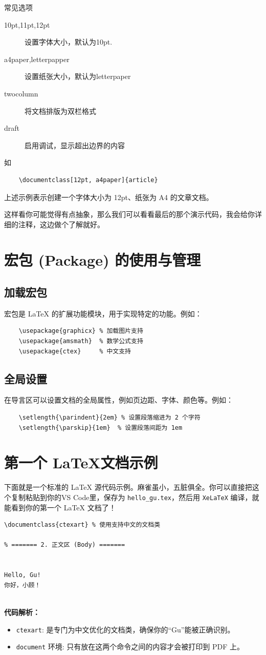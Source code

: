 \begin{mybox}{常见选项}
	\begin{description}
		\item[10pt,11pt,12pt]设置字体大小，默认为10pt.
		\item[a4paper,letterpapper]设置纸张大小，默认为letterpaper
		\item[twocolumn]将文档排版为双栏格式
		\item[draft]启用调试，显示超出边界的内容  
	\end{description}
\end{mybox}
如
\begin{lstlisting}
	\documentclass[12pt, a4paper]{article}
\end{lstlisting}
上述示例表示创建一个字体大小为 12pt、纸张为 A4 的文章文档。

这样看你可能觉得有点抽象，那么我们可以看看最后的那个演示代码，我会给你详细的注释，这边做个了解就好。


\section{宏包 (Package) 的使用与管理}
\subsection{加载宏包}
宏包是 LaTeX 的扩展功能模块，用于实现特定的功能。例如：
\begin{lstlisting}
	\usepackage{graphicx} % 加载图片支持
	\usepackage{amsmath}  % 数学公式支持
	\usepackage{ctex}     % 中文支持
\end{lstlisting}

\subsection{全局设置}
在导言区可以设置文档的全局属性，例如页边距、字体、颜色等。例如：
\begin{lstlisting}
	\setlength{\parindent}{2em} % 设置段落缩进为 2 个字符
	\setlength{\parskip}{1em}  % 设置段落间距为 1em
\end{lstlisting}

\newpage
\section{第一个 \LaTeX 文档示例}

下面就是一个标准的 \LaTeX{} 源代码示例。麻雀虽小，五脏俱全。你可以直接把这个复制粘贴到你的VS Code里，保存为 \texttt{hello\_gu.tex}，然后用 \texttt{XeLaTeX} 编译，就能看到你的第一个 \LaTeX{} 文档了！
\begin{lstlisting}[caption={Hello Gu 完整代码}]
% ======= 1. 导言区 (Preamble) =======
\documentclass{ctexart} % 使用支持中文的文档类

% ======= 2. 正文区 (Body) =======


Hello, Gu! 
你好，小顾！


\end{lstlisting}

\bigskip
\noindent \textbf{代码解析：}
\begin{itemize}
    \item \texttt{ctexart}: 是专门为中文优化的文档类，确保你的“Gu”能被正确识别。
    \item \texttt{document} 环境: 只有放在这两个命令之间的内容才会被打印到 PDF 上。
\end{itemize}